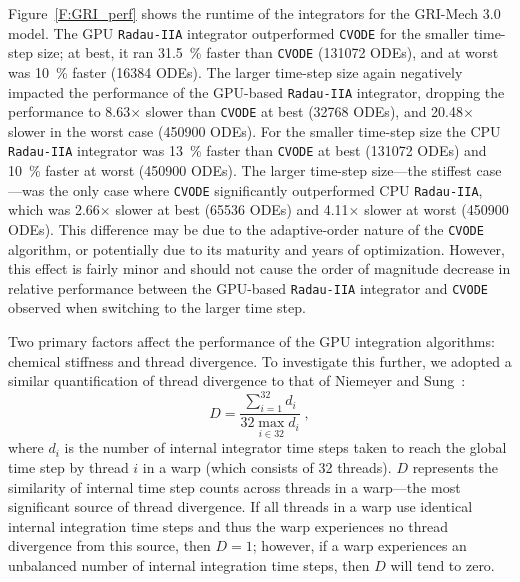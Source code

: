 \documentclass[preprint]{elsarticle}
\begin{document}
Figure~\ref{F:GRI_perf} shows the runtime of the integrators for the GRI-Mech 3.0 model.
The GPU \texttt{Radau-IIA} integrator outperformed \texttt{CVODE} for the smaller time-step size; at best, it ran \SI{31.5}{\percent} faster than \texttt{CVODE} (\num{131072} ODEs), and at worst was \SI{10}{\percent} faster (\num{16384} ODEs).
The larger time-step size again negatively impacted the performance of the GPU-based \texttt{Radau-IIA} integrator, dropping the performance to \num{8.63}$\times$ slower than \texttt{CVODE} at best (\num{32768} ODEs), and \num{20.48}$\times$ slower in the worst case (\num{450900} ODEs).
For the smaller time-step size the CPU \texttt{Radau-IIA} integrator was \SI{13}{\percent} faster than \texttt{CVODE} at best (\num{131072} ODEs) and \SI{10}{\percent} faster at worst (\num{450900} ODEs).
The larger time-step size---the stiffest case---was the only case where \texttt{CVODE} significantly outperformed CPU \texttt{Radau-IIA}, which was \num{2.66}$\times$ slower at best (\num{65536} ODEs) and \num{4.11}$\times$ slower at worst (\num{450900} ODEs).
This difference may be due to the adaptive-order nature of the \texttt{CVODE} algorithm, or potentially due to its maturity and years of optimization.
However, this effect is fairly minor and should not cause the order of magnitude decrease in relative performance between the GPU-based \texttt{Radau-IIA} integrator and \texttt{CVODE} observed when switching to the larger time step.

Two primary factors affect the performance of the GPU integration algorithms: chemical stiffness and thread divergence.
To investigate this further, we adopted a similar quantification of thread divergence to that of Niemeyer and Sung~\cite{Niemeyer:2014aa}:
\begin{equation}
	D = \frac{\sum_{i=1}^{32}{d_i}}{32 \max_{i \in 32} d_i} \;,
	\label{eqn:divergence}
\end{equation}
where $d_i$ is the number of internal integrator time steps taken to reach the global time step by thread $i$ in a warp (which consists of 32 threads).
$D$ represents the similarity of internal time step counts across threads in a warp---the most significant source of thread divergence.
If all threads in a warp use identical internal integration time steps and thus the warp experiences no thread divergence from this source, then $D = 1$; however, if a warp experiences an unbalanced number of internal integration time steps, then $D$ will tend to zero.
\end{document}
